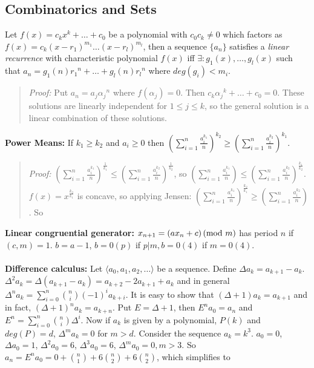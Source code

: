 \subsection{Combinatorics and Sets}
Let $f(x)= c_k x^k + \ldots + c_0$ be a polynomial
with $c_0 c_k \ne 0$ which factors as
$f(x)= c_k {(x- r_1 )}^{m_1} \ldots {(x- r_l )}^{m_l}$, then a sequence
$\{a_n \}$ satisfies a \emph{linear recurrence} with characteristic polynomial
$f(x)$ iff $\exists : g_1 (x) , \ldots , g_l (x)$ such that
$a_n = g_1 (n) {r_1}^n + \ldots + g_l (n) {r_l}^n$ where
$deg(g_{i})<m_{i}$.
\begin{quote}
\emph{Proof:} Put $a_n = a_j {\alpha_j}^n$ where $f(\alpha_j)=0$.
Then $c_k {\alpha_j}^k + \ldots + c_0 = 0$.  These solutions are linearly independent for $1 \leq j \leq k$, so the general solution
is a linear combination of these solutions.
\end{quote}
{\bf Power Means:}  If $k_1 \geq k_2$ and $a_i \geq 0$ then 
$ (\sum_{i=1}^n {\frac {a_i^{k_1}} {n}})^{k_2} \geq (\sum_{i=1}^n {\frac {a_i^{k_2}} {n}})^{k_1} $.
\begin{quote}
\emph{Proof:}
$(\sum_{i=1}^n {\frac {a_i^{k_1}} n})^{\frac 1 {k_1}} \leq (\sum_{i=1}^n {\frac {a_i^{k_2}} n})^{\frac 1 {k_2}}$,
so $(\sum_{i=1}^n {\frac {a_i^{k_1}} n})\leq (\sum_{i=1}^n {\frac {a_i^{k_2}} n})^{\frac {k_1} {k_2}}$.
$f(x) = x^{\frac {k_2} {k_1}}$ is concave, so applying Jensen:
$(\sum_{i=1}^n {\frac {a_i^{k_1}} n})^{\frac {k_2} {k_1}} \geq (\sum_{i=1}^n {\frac {a_i^{k_2}} n})$. So
\end{quote}
{\bf Linear congruential generator:}
$x_{n+1} = (a x_{n} + c) \thinspace \textnormal{(mod } m \textnormal{)}$
has period $n$ if $(c,m)=1$.  $b=a-1$, $b=0 (p)$ if $p|m, b=0 (4)$
if $m=0 (4)$.
\\
\\
{\bf Difference calculus:} Let $\langle a_0, a_1, a_2, \ldots \rangle$ be a sequence.  Define $\Delta a_k = a_{k+1} - a_k$.
$\Delta^2 a_k = \Delta (a_{k+1} - a_k) = a_{k+2} - 2a_{k+1} + a_k$ and in general
$\Delta^n a_k = \sum_{i=0}^n {n \choose i} (-1)^i a_{k+i}$.  It is easy to show that $(\Delta + 1) a_k = a_{k+1}$ and in
fact, $(\Delta + 1)^n a_k = a_{k+n}$.  
Put $E= \Delta + 1$, then $E^n a_0 = a_n$ and $E^n= \sum_{i=0}^n {n \choose i} \Delta^{i}$. Now if $a_k$ is given by
a polynomial, $P(k)$ and $deg(P) = d$, $\Delta^m a_k = 0$ for $m > d$.  Consider the sequence $a_k= k^3$.
$a_0 = 0$, $\Delta a_0 = 1$, $\Delta^2 a_0 = 6$, $\Delta^3 a_0 = 6$, $\Delta^m a_0 = 0, m > 3$.
So $a_n = E^n a_0 = 0 + {n \choose 1} + 6 {n \choose 2} + 6 {n \choose 2}$, which simplifies to
